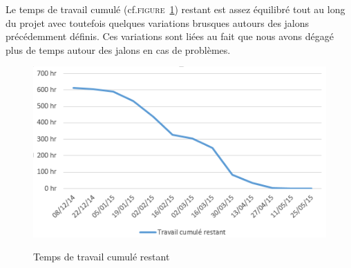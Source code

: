 Le temps de travail cumulé (cf.\textsc{figure~\ref{fig:avancement}}) restant est assez équilibré tout au long du projet avec toutefois quelques variations brusques autours des jalons précédemment définis.
Ces variations sont liées au fait que nous avons dégagé plus de temps autour des jalons en cas de problèmes.

\begin{figure}
	\centering
	\caption{Temps de travail cumulé restant}
		\includegraphics[width=\textwidth]{8-BilanPlanification/img/avancement.PNG}
	\label{fig:avancement}
\end{figure}